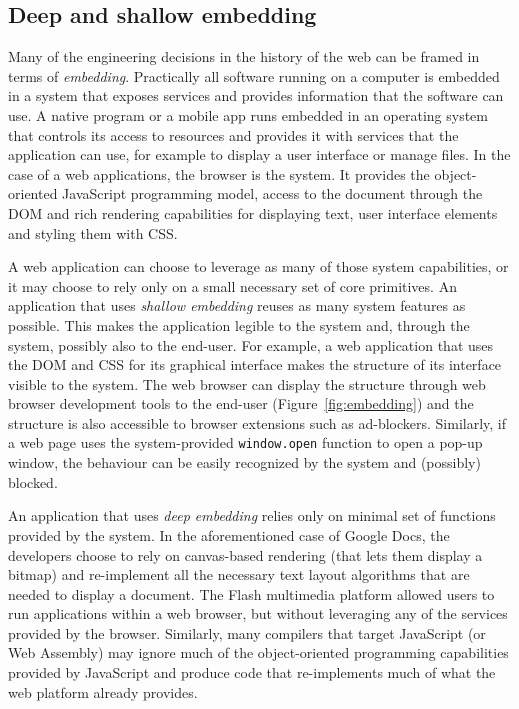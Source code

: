 \subsection{Deep and shallow embedding}
Many of the engineering decisions in the history of the web can be framed in terms of
\emph{embedding}. Practically all software running on a computer is embedded in a
system that exposes services and provides information that the software can use.
A native program or a mobile app runs embedded in an operating system that controls
its access to resources and provides it with services that the application can use,
for example to display a user interface or manage files. In the case of a web applications,
the browser is the system. It provides the object-oriented JavaScript programming
model, access to the document through the DOM and rich rendering capabilities for displaying
text, user interface elements and styling them with CSS.

A web application can choose to leverage as many of those system capabilities, or it may
choose to rely only on a small necessary set of core primitives. An application that uses
\emph{shallow embedding} reuses as many system features as possible. This makes the application
legible to the system and, through the system, possibly also to the end-user. For example,
a web application that uses the DOM and CSS for its graphical interface makes the structure
of its interface visible to the system. The web browser can display the structure through
web browser development tools to the end-user (Figure~\ref{fig:embedding}) and the structure
is also accessible to browser extensions such as ad-blockers. Similarly, if a web page uses
the system-provided \texttt{window.open} function to open a pop-up window, the behaviour can
be easily recognized by the system and (possibly) blocked.

An application that uses \emph{deep embedding} relies only on minimal set of functions
provided by the system. In the aforementioned case of Google Docs, the developers choose
to rely on canvas-based rendering (that lets them display a bitmap) and re-implement all
the necessary text layout algorithms that are needed to display a document. The Flash
multimedia platform allowed users to run applications within a web browser, but without
leveraging any of the services provided by the browser. Similarly, many compilers
 that target JavaScript (or Web Assembly) may ignore much of the object-oriented
programming capabilities provided by JavaScript and produce code that re-implements much
of what the web platform already provides.


